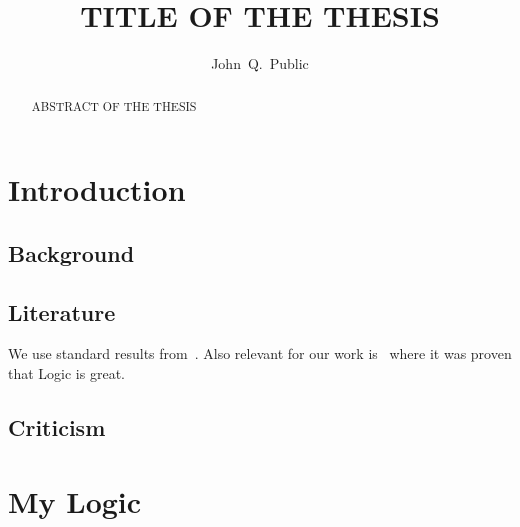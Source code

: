 \documentclass[titlepage,a4paper]{report}
\begin{document}
\title{TITLE OF THE THESIS}
\author{John~Q.~Public}
\maketitle

\begin{abstract}
  ABSTRACT OF THE THESIS

  \lipsum[10-11]
\end{abstract}


\clearpage

\tableofcontents

\chapter{Introduction}

\lipsum[1]

\section{Background}\label{sec:background}

\lipsum[2]

\section{Literature}

We use standard results from~\cite{BRV2001:Modal}.
Also relevant for our work is~\cite{BB1999:IPGames} where it was proven that Logic is great.

\lipsum[3-10]

\section{Criticism}

\lipsum[11-12]

\chapter{My Logic}
\end{document}
